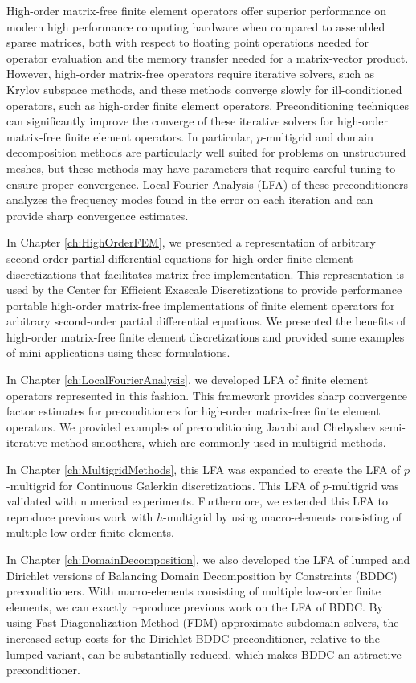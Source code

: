High-order matrix-free finite element operators offer superior performance on modern high performance computing hardware when compared to assembled sparse matrices, both with respect to floating point operations needed for operator evaluation and the memory transfer needed for a matrix-vector product.
However, high-order matrix-free operators require iterative solvers, such as Krylov subspace methods, and these methods converge slowly for ill-conditioned operators, such as high-order finite element operators.
Preconditioning techniques can significantly improve the converge of these iterative solvers for high-order matrix-free finite element operators.
In particular, $p$-multigrid and domain decomposition methods are particularly well suited for problems on unstructured meshes, but these methods may have parameters that require careful tuning to ensure proper convergence.
Local Fourier Analysis (LFA) of these preconditioners analyzes the frequency modes found in the error on each iteration and can provide sharp convergence estimates.

In Chapter \ref{ch:HighOrderFEM}, we presented a representation of arbitrary second-order partial differential equations for high-order finite element discretizations that facilitates matrix-free implementation.
This representation is used by the Center for Efficient Exascale Discretizations to provide performance portable high-order matrix-free implementations of finite element operators for arbitrary second-order partial differential equations.
We presented the benefits of high-order matrix-free finite element discretizations and provided some examples of mini-applications using these formulations.

In Chapter \ref{ch:LocalFourierAnalysis}, we developed LFA of finite element operators represented in this fashion.
This framework provides sharp convergence factor estimates for preconditioners for high-order matrix-free finite element operators.
We provided examples of preconditioning Jacobi and Chebyshev semi-iterative method smoothers, which are commonly used in multigrid methods.

In Chapter \ref{ch:MultigridMethods}, this LFA was expanded to create the LFA of $p$-multigrid for Continuous Galerkin discretizations.
This LFA of $p$-multigrid was validated with numerical experiments.
Furthermore, we extended this LFA to reproduce previous work with $h$-multigrid by using macro-elements consisting of multiple low-order finite elements.

In Chapter \ref{ch:DomainDecomposition}, we also developed the LFA of lumped and Dirichlet versions of Balancing Domain Decomposition by Constraints (BDDC) preconditioners.
With macro-elements consisting of multiple low-order finite elements, we can exactly reproduce previous work on the LFA of BDDC.
By using Fast Diagonalization Method (FDM) approximate subdomain solvers, the increased setup costs for the Dirichlet BDDC preconditioner, relative to the lumped variant, can be substantially reduced, which makes BDDC an attractive preconditioner.

